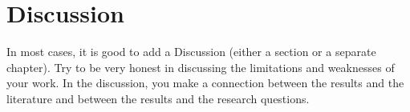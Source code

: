 \chapter{Discussion}


In most cases, it is good to add a Discussion (either a section or a
separate chapter). Try to be very honest in discussing the limitations
and weaknesses of your work. In the discussion, you make a
connection between the results and the literature and between the
results and the research questions.